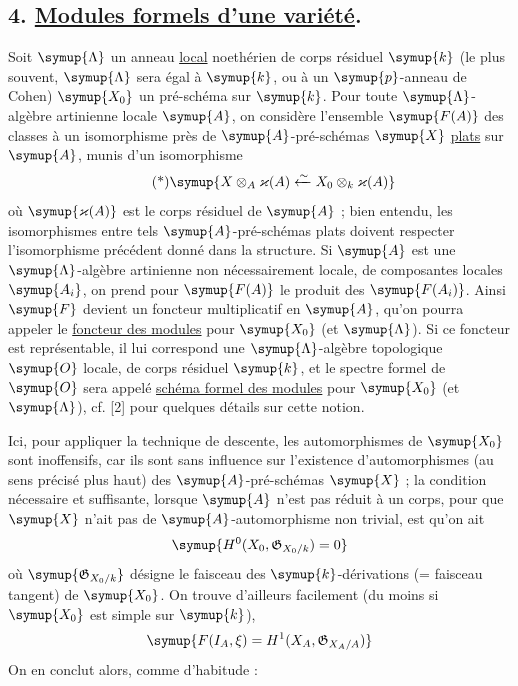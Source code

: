 \subsection*{\textnormal{4. \uline{Modules formels d'une variété}.}}

Soit $\symup{\Lambda}$ un anneau \uline{local} noethérien de corps résiduel $\symup{k}$ (le plus
souvent, $\symup{\Lambda}$ sera égal à $\symup{k}$, ou à un $\symup{p}$-anneau de Cohen) $\symup{X_0}$ un
pré-schéma sur $\symup{k}$. Pour toute $\symup{\Lambda}$-algèbre artinienne locale $\symup{A}$, on
considère l'ensemble $\symup{F(A)}$ des classes à un isomorphisme près de
$\symup{A}$-pré-schémas $\symup{X}$ \uline{plats} sur $\symup{A}$, munis d'un isomorphisme
\begin{equation}\tag{*}
  \symup{X\otimes_A\varkappa(A)\xleftarrow{\sim}
  X_0\otimes_k\varkappa(A)}
\end{equation}
où $\symup{\varkappa(A)}$ est le corps résiduel de $\symup{A}$ ; bien entendu, les isomorphismes
entre tels $\symup{A}$-pré-schémas plats doivent respecter l'isomorphisme précédent
donné dans la structure. Si $\symup{A}$ est une $\symup{\Lambda}$-algèbre artinienne non
nécessairement locale, de composantes locales $\symup{A_i}$, on prend pour $\symup{F(A)}$ le
produit des $\symup{F(A_i)}$. Ainsi $\symup{F}$ devient un foncteur multiplicatif en $\symup{A}$, qu'on
pourra appeler le \uline{foncteur des modules} pour $\symup{X_0}$ (et $\symup{\Lambda}$). Si ce
foncteur est représentable, il lui correspond une $\symup{\Lambda}$-algèbre
topologique $\symup{O}$ locale, de corps résiduel $\symup{k}$, et le spectre formel de $\symup{O}$ sera
appelé \uline{schéma formel des modules} pour $\symup{X_0}$ (et $\symup{\Lambda}$), cf. [2] pour
quelques détails sur cette notion.

Ici, pour appliquer la technique de descente, les automorphismes  de
$\symup{X_0}$ sont inoffensifs, car ils sont sans influence sur l'existence
d'automorphismes (au sens précisé plus haut) des $\symup{A}$-pré-schémas $\symup{X}$ ; la
condition nécessaire et suffisante, lorsque $\symup{A}$ n'est pas réduit à un corps,
pour que $\symup{X}$ n'ait pas de $\symup{A}$-automorphisme non trivial, est qu'on ait
\[
  \symup{H^0(X_0,\mathfrak G_{X_0/k})=0}
\]
où $\symup{\mathfrak G_{X_0/k}}$ désigne le faisceau des $\symup{k}$-dérivations (= faisceau
tangent) de $\symup{X_0}$.
On trouve d'ailleurs facilement (du moins si $\symup{X_0}$ est
simple sur $\symup{k}$),
\[
  \symup{F(I_A,\xi)=H^1(X_A,\mathfrak G_{X_A/A})}
\]
On en conclut alors, comme d'habitude :

